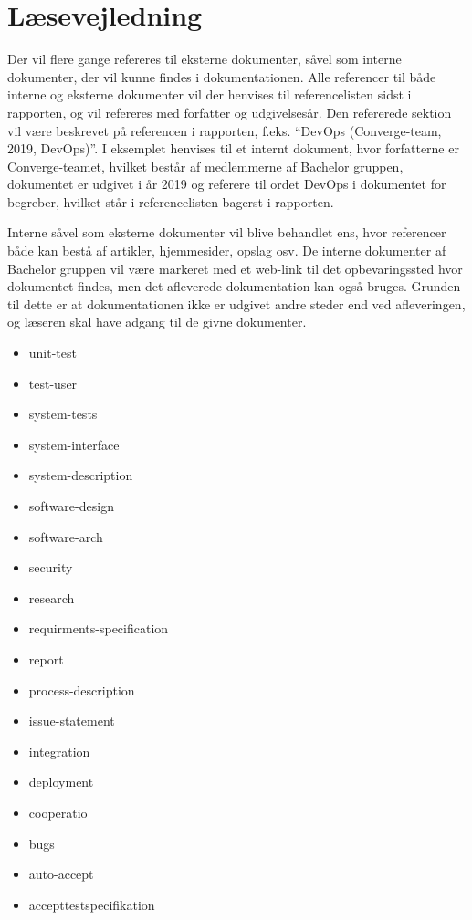 \chapter{Læsevejledning}

Der vil flere gange refereres til eksterne dokumenter, såvel som interne dokumenter, der vil kunne findes i dokumentationen. Alle referencer til både interne og eksterne dokumenter vil der henvises til referencelisten sidst i rapporten, og vil refereres med forfatter og udgivelsesår. Den refererede sektion vil være beskrevet på referencen i rapporten, f.eks. “DevOps (Converge-team, 2019, DevOps)”. I eksemplet henvises til et internt dokument, hvor forfatterne er Converge-teamet, hvilket består af medlemmerne af Bachelor gruppen, dokumentet er udgivet i år 2019 og referere til ordet DevOps \cite[DevOps]{converge-terms} i dokumentet for begreber, hvilket står i referencelisten bagerst i rapporten.

Interne såvel som eksterne dokumenter vil blive behandlet ens, hvor referencer både kan bestå af artikler, hjemmesider, opslag osv. De interne dokumenter af Bachelor gruppen vil være markeret med et web-link til det opbevaringssted hvor dokumentet findes, men det afleverede dokumentation kan også bruges. Grunden til dette er at dokumentationen ikke er udgivet andre steder end ved afleveringen, og læseren skal have adgang til de givne dokumenter.

\begin{itemize}
    
    \item unit-test
    \item test-user
    \item system-tests
    \item system-interface
    \item system-description
    \item software-design
    \item software-arch
    \item security
    \item research
    \item requirments-specification
    \item report
    \item process-description
    \item issue-statement
    \item integration
    \item deployment
    \item cooperatio
    \item bugs
    \item auto-accept
    \item accepttestspecifikation
\end{itemize}